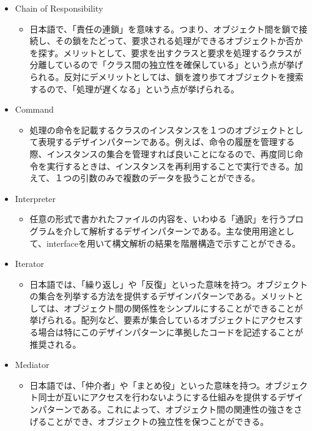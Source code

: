 \documentclass[dvipdfmx]{jsarticle}
\begin{document}
\begin{itemize}
  \item Chain of Responsibility
  \begin{itemize}
    \item 日本語で、「責任の連鎖」を意味する。つまり、オブジェクト間を鎖で接続し、その鎖をたどって、要求される処理ができるオブジェクトか否かを探す。メリットとして、要求を出すクラスと要求を処理するクラスが分離しているので「クラス間の独立性を確保している」という点が挙げられる。反対にデメリッ卜としては、鎖を渡り歩てオブジェクトを捜索するので、「処理が遅くなる」という点が挙げられる。
  \end{itemize}
  \item Command
  \begin{itemize}
    \item 処理の命令を記載するクラスのインスタンスを１つのオブジェクトとして表現するデザインパターンである。例えば、命令の履歴を管理する際、インスタンスの集合を管理すれば良いことになるので、再度同じ命令を実行するときは、インスタンスを再利用することで実行できる。加えて、１つの引数のみで複数のデータを扱うことができる。
  \end{itemize}
  \item Interpreter
  \begin{itemize}
    \item 任意の形式で書かれたファイルの内容を、いわゆる「通訳」を行うプログラムを介して解析するデザインパターンである。主な使用用途として、interfaceを用いて構文解析の結果を階層構造で示すことができる。
  \end{itemize}
  \item Iterator
  \begin{itemize}
    \item 日本語では、「繰り返し」や「反復」といった意味を持つ。オブジェクトの集合を列挙する方法を提供するデザインパターンである。メリットとしては、オブジェクト間の関係性をシンプルにすることができることが挙げられる。配列など、要素が集合しているオブジェクトにアクセスする場合は特にこのデザインパターンに準拠したコードを記述することが推奨される。
  \end{itemize}
  \item Mediator
  \begin{itemize}
    \item 日本語では、「仲介者」や「まとめ役」といった意味を持つ。オブジェクト同士が互いにアクセスを行わないようにする仕組みを提供するデザインパターンである。これによって、オブジェクト間の関連性の強さをさげることができ、オブジェクトの独立性を保つことができる。
  \end{itemize}

\end{itemize}
\end{document}
